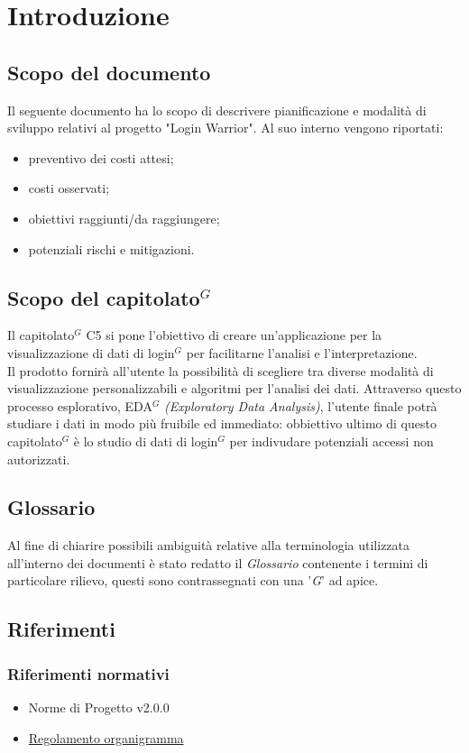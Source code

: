 \section{Introduzione}
\subsection{Scopo del documento}
Il seguente documento ha lo scopo di descrivere pianificazione e modalità di sviluppo relativi al progetto "Login Warrior".
Al suo interno vengono riportati:
\begin{itemize}
    \item preventivo dei costi attesi;
    \item costi osservati;
    \item obiettivi raggiunti/da raggiungere;
    \item potenziali rischi e mitigazioni.
\end{itemize}

\subsection{Scopo del capitolato$^G$ }
Il capitolato$^G$  C5 si pone l'obiettivo di creare un'applicazione per la visualizzazione di dati di login$^G$
per facilitarne l'analisi e l'interpretazione.\\
Il prodotto fornirà all'utente la possibilità di scegliere tra diverse
modalità di visualizzazione personalizzabili e algoritmi per l'analisi dei dati.
Attraverso questo processo esplorativo, EDA$^G$  \textit{(Exploratory Data Analysis)},
l'utente finale potrà studiare i dati in modo più fruibile ed immediato: obbiettivo ultimo
di questo capitolato$^G$  è lo studio di dati di login$^G$  per indivudare potenziali accessi non autorizzati.

\subsection{Glossario}
Al fine di chiarire possibili ambiguità relative alla terminologia utilizzata all'interno dei documenti è stato redatto il \textit{Glossario} contenente i termini di particolare rilievo,
questi sono contrassegnati con una '\textit{G}' ad apice.

\subsection{Riferimenti}
\subsubsection{Riferimenti normativi}
\begin{itemize}
    \item Norme di Progetto v2.0.0
    \item \href{https://www.math.unipd.it/~tullio/IS-1/2021/Progetto/Capitolati.html}{Regolamento organigramma}
\end{itemize}
